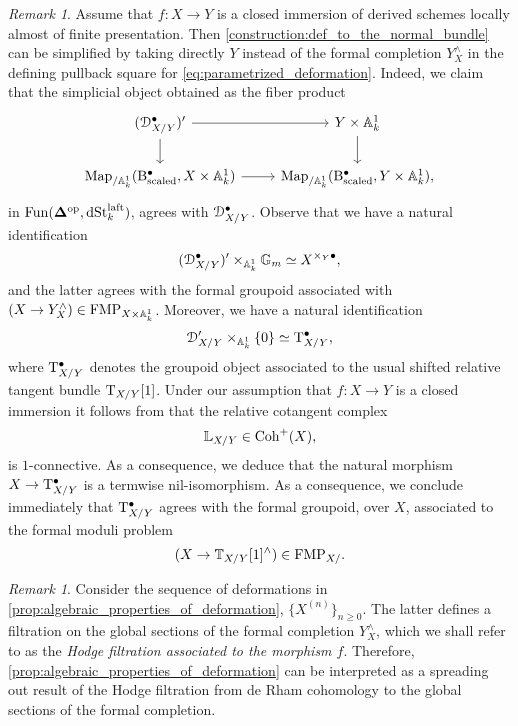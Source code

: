 \documentclass[10pt,a4paper,reqno]{amsart} %
\theoremstyle{plain}
\theoremstyle{definition}
\theoremstyle{remark}
\newtheorem{rem}[thm]{Remark}
\numberwithin{equation}{section}
\begin{document}
\begin{rem} \label{rem:simplification_of_deformation_in_the_closed_immersion}
    Assume that $f \colon X \to Y$ is a closed immersion of derived schemes locally almost of finite presentation.
    Then \cref{construction:def_to_the_normal_bundle} can be simplified by taking directly $Y$ instead of the formal completion $Y^\wedge_X$
    in the defining pullback square for \eqref{eq:parametrized_deformation}. Indeed, we claim that the simplicial object
    obtained as the fiber product
        \[
        \begin{tikzcd}
            (\cD_{X/ Y}^\bullet) ' \ar{r} \ar{d} & Y \times \bbA^1_k \ar{d}\\
            \Map_{/ \bbA^1_k}(\rB^\bullet_\mathrm{scaled}, X\times \bbA^1_k) \ar{r} & \Map_{/ \bbA^1_k} (\rB^\bullet_\mathrm{scaled}, Y \times \bbA^1_k),
        \end{tikzcd}
        \]
    in $\operatorname{Fun}(\bm{\Delta} ^\mathrm{op}, \mathrm{dSt}_k^{\mathrm{laft}})$, agrees with $\mathcal D^\bullet_{X/ Y}$. Observe that we have a natural identification
        \[
            (\mathcal D_{X/ Y}^\bullet)' \times_{\mathbb A^1_k} \mathbb G_m \simeq X^{\times_Y \bullet} ,
        \]
    and the latter agrees with the formal groupoid associated with $(X \to Y^\wedge_X) \in \mathrm{FMP}_{X \times \mathbb A^1_k}$. Moreover, we
    have a natural identification
        \[
            \mathcal D_{X/ Y}' \times_{\mathbb A^1_k} \{0 \} \simeq \mathrm T^\bullet_{X/ Y},
        \]
    where $\mathrm T^\bullet_{X/ Y}$ denotes the groupoid object associated to the usual shifted relative tangent bundle $\mathrm T_{X/ Y}[1]$.
    Under our assumption that $f \colon X \to Y$ is a closed immersion it follows from \cite[Corollary 8.4.3.2]{Lurie_Higher_algebra} that the relative cotangent complex
        \[  
            \mathbb L_{X/ Y} \in \mathrm{Coh}^+(X),
        \]
    is $1$-connective. As a consequence, we deduce that the natural morphism $X \to \mathrm T^\bullet_{X/Y}$ is a termwise nil-isomorphism. As a consequence,
    we conclude immediately that $\mathrm T^\bullet_{X/ Y}$
    agrees with the formal groupoid,
    over $X$, associated to the formal moduli problem
        \[  
            (X \to \mathbb T_{X/ Y}[1]^\wedge) \in \mathrm{FMP}_{X/ }.
        \]
\end{rem}

\begin{rem}
    Consider the sequence of deformations in \cref{prop:algebraic_properties_of_deformation}, $\{ X^{(n)} \}_{n \ge 0}$.
    The latter defines a filtration on the global sections of the formal completion $Y^\wedge_X$, which we shall
    refer to as the \emph{Hodge filtration associated to the morphism $f$}. Therefore, \cref{prop:algebraic_properties_of_deformation}
    can be interpreted as a spreading out result of the Hodge filtration
    from de Rham cohomology to the global sections of the formal completion.
\end{rem}
\end{document}
